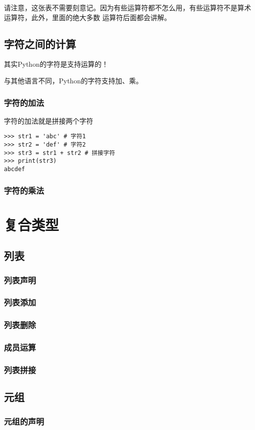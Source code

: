 \documentclass{book}
\begin{document}
请注意，这张表不需要刻意记。因为有些运算符都不怎么用，有些运算符不是算术运算符，此外，里面的绝大多数
运算符后面都会讲解。
\section{字符之间的计算}
\indent 其实Python的字符是支持运算的！


与其他语言不同，Python的字符支持加、乘。
\subsection{字符的加法}
\indent 字符的加法就是拼接两个字符


\begin{verbatim}
>>> str1 = 'abc' # 字符1
>>> str2 = 'def' # 字符2
>>> str3 = str1 + str2 # 拼接字符
>>> print(str3)
abcdef
\end{verbatim}
\subsection{字符的乘法}
\chapter{复合类型}
\section{列表}
\subsection{列表声明}
\subsection{列表添加}
\subsection{列表删除}
\subsection{成员运算}
\subsection{列表拼接}
\section{元组}
\subsection{元组的声明}
\end{document}
